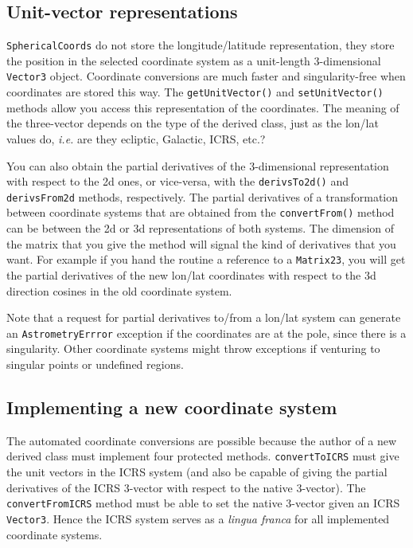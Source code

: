 \documentclass[11pt,preprint,flushrt]{aastex}
\begin{document}
\subsection{Unit-vector representations}
{\tt SphericalCoords} do not store the longitude/latitude representation, they store the position in the selected coordinate system as a unit-length 3-dimensional {\tt Vector3} object.  Coordinate conversions are much faster and singularity-free when coordinates are stored this way.  The {\tt getUnitVector()} and {\tt setUnitVector()} methods allow you access this representation of the coordinates.  The meaning of the three-vector depends on the type of the derived class, just as the lon/lat values do, {\it i.e.} are they ecliptic, Galactic, ICRS, etc.?

You can also obtain the partial derivatives of the 3-dimensional representation with respect to the 2d ones, or vice-versa, with the {\tt derivsTo2d()} and {\tt derivsFrom2d} methods, respectively.  The partial derivatives of a transformation between coordinate systems that are obtained from the {\tt convertFrom()} method can be between the 2d or 3d representations of both systems.  The dimension of the matrix that you give the method will signal the kind of derivatives that you want.  For example if you hand the routine a reference to a {\tt Matrix23}, you will get the partial derivatives of the new lon/lat coordinates with respect to the 3d direction cosines in the old coordinate system.

Note that a request for partial derivatives to/from a lon/lat system can generate an {\tt AstrometryErrror} exception if the coordinates are at the pole, since there is a singularity.  Other coordinate systems might throw exceptions if venturing to singular points or undefined regions.

\subsection{Implementing a new coordinate system}
The automated coordinate conversions are possible because the author of a new derived class must implement four protected methods.  {\tt convertToICRS} must give the unit vectors in the ICRS system (and also be capable of giving the partial derivatives of the ICRS 3-vector with respect to the native 3-vector).   The {\tt convertFromICRS} method must be able to set the native 3-vector given an ICRS {\tt Vector3}.  Hence the ICRS system serves as a {\it lingua franca} for all implemented coordinate systems.
\end{document}
